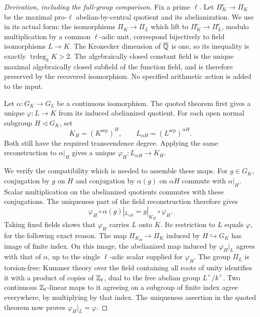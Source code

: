 \begin{proof}[Derivation, including the full-group comparison]
Fix a prime $\ell$.  Let $\Pi_K^c\to\Pi_K$ be the maximal pro-$\ell$
abelian-by-central quotient and its abelianization.  We use
\cite[Theorem 1.2(4), with Theorem 1.1]{Pop2018Divisorial} in its
actual form: the isomorphisms $\Pi_K\to\Pi_L$ which lift to
$\Pi_K^c\to\Pi_L^c$, modulo multiplication by a common
$\ell$-adic unit, correspond bijectively to field isomorphisms
$L\to K$.  The Kronecker dimension of $\overline{\mathbb Q}$ is one,
so its inequality is exactly $\operatorname{trdeg}_kK>2$.
The algebraically closed constant field is the unique maximal
algebraically closed subfield of the function field, and is
therefore preserved by the recovered isomorphism.  No specified
arithmetic action is added to the input.

Let $\alpha:G_K\to G_L$ be a continuous isomorphism.  The quoted
theorem first gives a unique $\varphi:L\to K$ from its induced
abelianized quotient.  For each open normal subgroup $H\triangleleft
G_K$, set
\[
 K_H=(K^{\mathrm{sep}})^H,\qquad
 L_{\alpha H}=(L^{\mathrm{sep}})^{\alpha H}.
\]
Both still have the required transcendence degree.  Applying the
same reconstruction to $\alpha|_H$ gives a unique
$\varphi_H:L_{\alpha H}\to K_H$.

We verify the compatibility which is needed to assemble these
maps.  For $g\in G_K$, conjugation by $g$ on $H$ and conjugation
by $\alpha(g)$ on $\alpha H$ commute with $\alpha|_H$.
Scalar multiplication on the abelianized quotients commutes with
these conjugations.  The uniqueness part of the field
reconstruction therefore gives
\[
 \varphi_H\circ\alpha(g)|_{L_{\alpha H}}
       =g|_{K_H}\circ\varphi_H.                            \tag{E.T34}
\]
Taking fixed fields shows that $\varphi_H$ carries $L$ onto $K$.
Its restriction to $L$ equals $\varphi$, for the following exact
reason.  The map $\Pi_{K_H}\to\Pi_K$ induced by $H\hookrightarrow
G_K$ has image of finite index.  On this image, the abelianized
map induced by $\varphi_H|_L$ agrees with that of $\alpha$, up to
the single $\ell$-adic scalar supplied for $\varphi_H$.
The group $\Pi_L$ is torsion-free: Kummer theory over the field
containing all roots of unity identifies it with a product of
copies of $\mathbb Z_\ell$, dual to the free abelian group $L^\times/k^\times$.
Two continuous $\mathbb Z_\ell$-linear maps to it agreeing on a subgroup
of finite index agree everywhere, by multiplying by that index.
The uniqueness assertion in the quoted theorem now proves
$\varphi_H|_L=\varphi$.


\end{proof}
